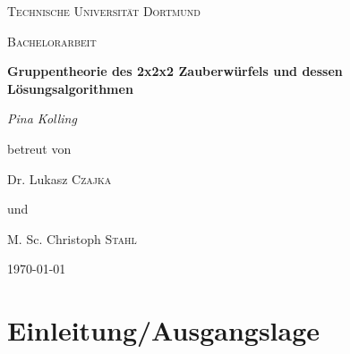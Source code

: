 \documentclass[12pt,a4paper, usenames, dvipsnames]{article}
\begin{document}
\begin{titlepage}
	\centering
	\vspace*{4cm}
	{\scshape\LARGE Technische Universität Dortmund \par}
	\vspace{1cm}
	{\scshape\Large Bachelorarbeit \par }
	\vspace{1.5cm}
	{\huge\bfseries  Gruppentheorie des 2x2x2 Zauberwürfels und dessen Lösungsalgorithmen \par}
	\vspace{2cm}
	{\Large\itshape Pina Kolling\par}
	\vfill
	betreut von\par
	Dr. Lukasz \textsc{Czajka} \par 
	und \par 
	M. Sc. Christoph \textsc{Stahl} 

	\vfill

	{\large \today\par}
\end{titlepage}


\tableofcontents

\thispagestyle{empty} 



\newpage

\setcounter{page}{1} 



















\section{Einleitung/Ausgangslage}
\end{document}
